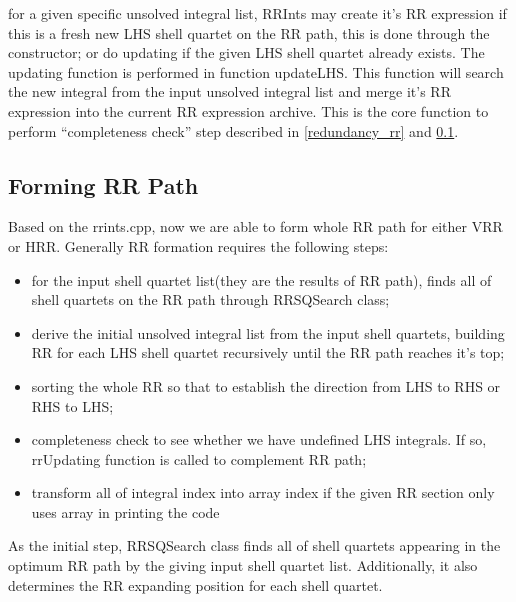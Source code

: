 for a given specific unsolved integral list, RRInts may create it's RR 
expression if this is a fresh new LHS shell quartet on the RR path, this
is done through the constructor; or do updating if the given LHS shell 
quartet already exists. The updating function is performed in function
updateLHS. This function will search the new integral from the input
unsolved integral list and merge it's RR expression into the current RR
expression archive. This is the core function to perform ``completeness
check'' step described in \ref{redundancy_rr} and \ref{rr_code}.

\subsection{Forming RR Path}
\label{rr_code}
%
%
Based on the rrints.cpp, now we are able to form whole RR path for 
either VRR or HRR. Generally RR formation requires the following 
steps:
\begin{itemize}
 \item for the input shell quartet list(they are the results of RR path), 
 finds all of shell quartets on the RR path through RRSQSearch class;
 \item derive the initial unsolved integral list from the input 
 shell quartets, building RR for each LHS shell quartet recursively
 until the RR path reaches it's top;
 \item sorting the whole RR so that to establish the direction from
 LHS to RHS or RHS to LHS;
 \item completeness check to see whether we have undefined LHS integrals.
 If so, rrUpdating function is called to complement RR path;
 \item transform all of integral index into array index if the given RR
 section only uses array in printing the code
\end{itemize}

As the initial step, RRSQSearch class finds all of shell quartets appearing
in the optimum RR path by the giving input shell quartet list. Additionally,
it also determines the RR expanding position for each shell quartet. 

